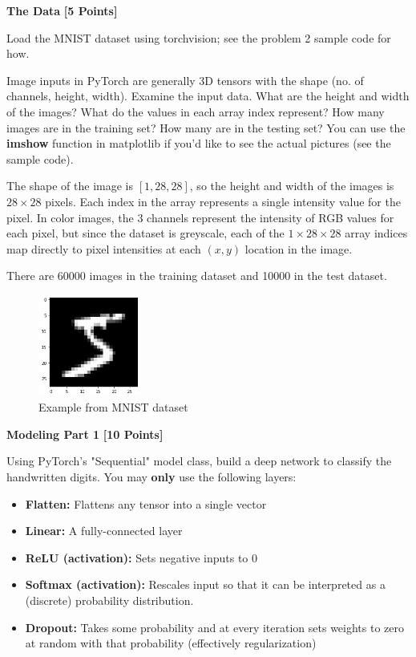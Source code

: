 \newpage

\problem \textbf{The Data} \textbf{[5 Points]}

Load the MNIST dataset using torchvision; see the problem 2 sample code for how.

Image inputs in PyTorch are generally 3D tensors with the shape (no. of channels, height, width). Examine the input data. What are the height and width of the images? What do the values in each array index represent?  How many images are in the training set? How many are in the testing set? You can use the \textbf{imshow} function in matplotlib if you'd like to see the actual pictures (see the sample code).

\begin{solution}
    The shape of the image is $[1, 28, 28]$, so the height and width of the images is $28 \times 28$ pixels. Each index in the array represents a single intensity value for the pixel. In color images, the 3 channels represent the intensity of RGB values for each pixel, but since the dataset is greyscale, each of the $1 \times 28 \times 28$ array indices map directly to pixel intensities at each $(x,y)$ location in the image.

    There are 60000 images in the training dataset and 10000 in the test dataset.

    \begin{figure}[H]
        \centering
        \includegraphics[width=0.3\textwidth]{images/2b.png}
        \caption{Example from MNIST dataset}
        \label{fig:2b}
    \end{figure}
\end{solution}

 \problem \textbf{Modeling Part 1} \textbf{[10 Points]}

 Using PyTorch's "Sequential" model class, build a deep network to classify the handwritten digits. You may \textbf{only} use the following layers:

 \begin{itemize}
    \item \textbf{Flatten:} Flattens any tensor into a single vector
    \item \textbf{Linear:} A fully-connected layer
    \item \textbf{ReLU (activation):} Sets negative inputs to 0
    \item \textbf{Softmax (activation):} Rescales input so that it can be interpreted as a (discrete) probability distribution.
    \item \textbf{Dropout:} Takes some probability and at every iteration sets weights to zero at random with that probability (effectively regularization)
\end{itemize}

